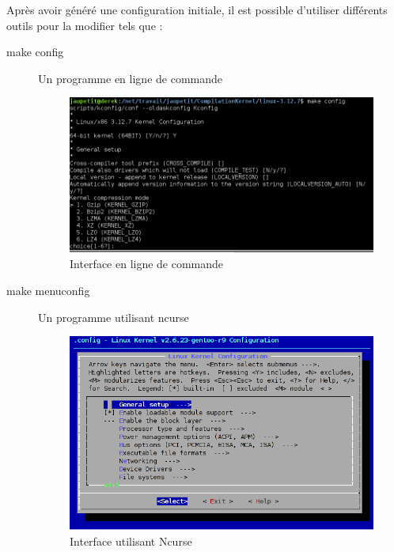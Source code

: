 \documentclass[17pts]{report}
\begin{document}
Après avoir généré une configuration initiale, il est possible d’utiliser
différents outils pour la modifier tels que :

\begin{description}
\item[make config]              Un programme en ligne de commande \\
        \begin{figure}[H]
            \includegraphics[scale=0.7]{illustrations/configLine.png}
            \centering
            \caption{Interface en ligne de commande}
            \label{fig:MakeConfig}
        \end{figure}
        \pagebreak
    \item[make menuconfig]      Un programme utilisant ncurse \\
        \begin{figure}[H]
            \includegraphics[scale=0.7]{illustrations/menuconfig.png}
            \centering
            \caption{Interface utilisant Ncurse}
            \label{fig:MakeMenuConfig}
        \end{figure}

\end{description}
\end{document}
